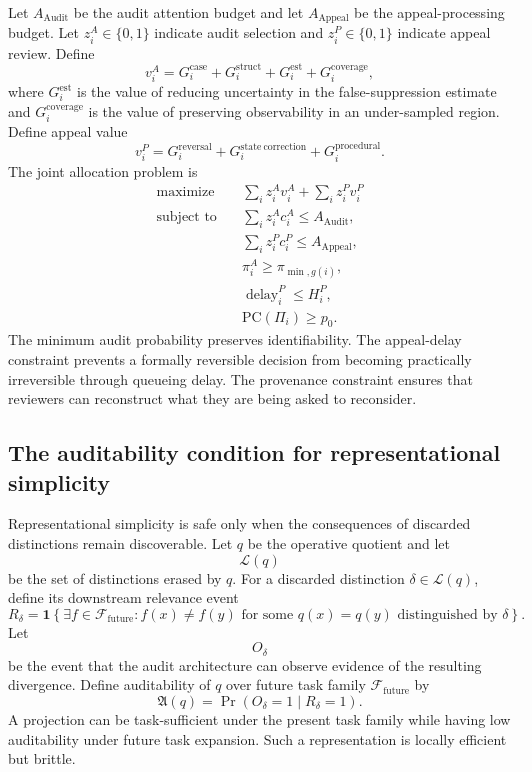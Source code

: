 \documentclass[11pt]{article}
\theoremstyle{definition}
\DeclareMathOperator{\Audit}{Audit}
\DeclareMathOperator{\Prob}{Pr}
\DeclareMathOperator{\Appeal}{Appeal}
\newcommand{\ind}{\mathbf{1}}
\begin{document}
Let \(A_{\Audit}\) be the audit attention budget and let \(A_{\Appeal}\) be the appeal-processing budget. Let \(z_i^{A}\in\{0,1\}\) indicate audit selection and \(z_i^{P}\in\{0,1\}\) indicate appeal review. Define
\[
v_i^{A}
=
G_i^{\mathrm{case}}
+
G_i^{\mathrm{struct}}
+
G_i^{\mathrm{est}}
+
G_i^{\mathrm{coverage}},
\]
where \(G_i^{\mathrm{est}}\) is the value of reducing uncertainty in the false-suppression estimate and \(G_i^{\mathrm{coverage}}\) is the value of preserving observability in an under-sampled region. Define appeal value
\[
v_i^{P}
=
G_i^{\mathrm{reversal}}
+
G_i^{\mathrm{state\ correction}}
+
G_i^{\mathrm{procedural}}.
\]
The joint allocation problem is
\[
\begin{aligned}
\text{maximize}\quad&
\sum_i z_i^{A}v_i^{A}
+
\sum_i z_i^{P}v_i^{P}
\\
\text{subject to}\quad&
\sum_i z_i^{A}c_i^{A}
\leq
A_{\Audit},
\\
&
\sum_i z_i^{P}c_i^{P}
\leq
A_{\Appeal},
\\
&
\pi_i^{A}\geq\pi_{\min,g(i)},
\\
&
\operatorname{delay}_i^{P}\leq H_i^{P},
\\
&
\mathrm{PC}(\Pi_i)\geq p_0.
\end{aligned}
\]
The minimum audit probability preserves identifiability. The appeal-delay constraint prevents a formally reversible decision from becoming practically irreversible through queueing delay. The provenance constraint ensures that reviewers can reconstruct what they are being asked to reconsider.

\subsection{The auditability condition for representational simplicity}

Representational simplicity is safe only when the consequences of discarded distinctions remain discoverable. Let \(q\) be the operative quotient and let
\[
\mathcal{L}(q)
\]
be the set of distinctions erased by \(q\). For a discarded distinction \(\delta\in\mathcal{L}(q)\), define its downstream relevance event
\[
R_\delta
=
\ind\!\left\{
\exists f\in\mathcal{F}_{\mathrm{future}}
:
f(x)\neq f(y)
\text{ for some }q(x)=q(y)
\text{ distinguished by }\delta
\right\}.
\]
Let
\[
O_\delta
\]
be the event that the audit architecture can observe evidence of the resulting divergence. Define auditability of \(q\) over future task family \(\mathcal{F}_{\mathrm{future}}\) by
\[
\mathfrak{A}(q)
=
\Prob(O_\delta=1\mid R_\delta=1).
\]
A projection can be task-sufficient under the present task family while having low auditability under future task expansion. Such a representation is locally efficient but brittle.
\end{document}
